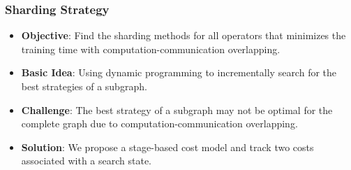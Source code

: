 \documentclass[12pt,aspectratio=169]{beamer}
\begin{document}
    \begin{frame}
        \frametitle{Sharding Strategy}

        \begin{itemize}
            \setlength{\itemsep}{.5em}
            \item \textbf{Objective}: Find the sharding methods for all operators that minimizes the training time with computation-communication overlapping.
            \item \textbf{Basic Idea}: Using dynamic programming to incrementally search for the best strategies of a subgraph.
            \item \textbf{Challenge}: The best strategy of a subgraph may not be optimal for the complete graph due to computation-communication overlapping.
            \item \textbf{Solution}: We propose a stage-based cost model and track two costs associated with a search state.
        \end{itemize}
    \end{frame}
\end{document}
